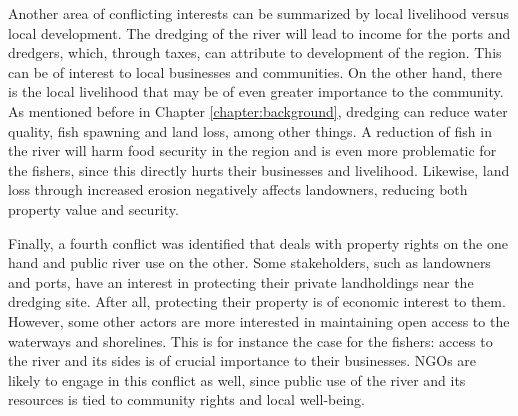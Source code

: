 Another area of conflicting interests can be summarized by local livelihood versus local development. The dredging of the river will lead to income for the ports and dredgers, which, through taxes, can attribute to development of the region. This can be of interest to local businesses and communities. On the other hand, there is the local livelihood that may be of even greater importance to the community. As mentioned before in Chapter \ref{chapter:background}, dredging can reduce water quality, fish spawning and land loss, among other things. A reduction of fish in the river will harm food security in the region and is even more problematic for the fishers, since this directly hurts their businesses and livelihood. Likewise, land loss through increased erosion negatively affects landowners, reducing both property value and security.

Finally, a fourth conflict was identified that deals with property rights on the one hand and public river use on the other. Some stakeholders, such as landowners and ports, have an interest in protecting their private landholdings near the dredging site. After all, protecting their property is of economic interest to them. However, some other actors are more interested in maintaining open access to the waterways and shorelines. This is for instance the case for the fishers: access to the river and its sides is of crucial importance to their businesses. NGOs are likely to engage in this conflict as well, since public use of the river and its resources is tied to community rights and local well-being.



